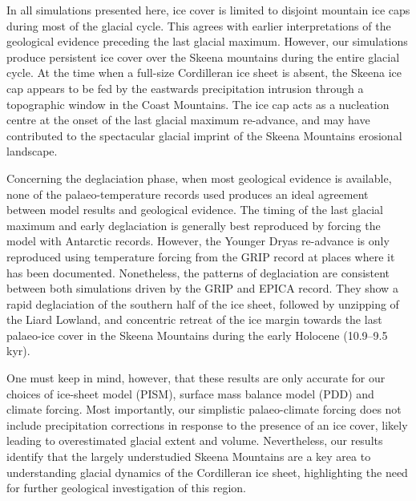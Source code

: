 \documentclass[tc, manuscript]{copernicus}
\begin{document}
In all simulations presented here, ice cover is limited to disjoint mountain ice
caps during most of the glacial cycle. This agrees with earlier interpretations
of the geological evidence preceding the last glacial maximum. However, our
simulations produce persistent ice cover over the Skeena mountains during
the entire glacial cycle. At the time when a full-size Cordilleran ice sheet is
absent, the Skeena ice cap appears to be fed by the eastwards precipitation
intrusion through a topographic window in the Coast Mountains. The ice cap acts
as a nucleation centre at the onset of the last glacial maximum re-advance, and
may have contributed to the spectacular glacial imprint of the Skeena Mountains
erosional landscape.

Concerning the deglaciation phase, when most geological evidence is available,
none of the palaeo-temperature records used produces an ideal agreement between
model results and geological evidence. The timing of the last glacial maximum
and early deglaciation is generally best reproduced by forcing the model with
Antarctic records. However, the Younger Dryas re-advance is only reproduced
using temperature forcing from the GRIP record at places where it has been
documented. Nonetheless, the patterns of deglaciation are consistent between
both simulations driven by the GRIP and EPICA record. They show a rapid
deglaciation of the southern half of the ice
sheet, followed by unzipping of the Liard Lowland, and concentric retreat of
the ice margin towards the last palaeo-ice cover in the Skeena Mountains
during the early Holocene (10.9--9.5\,kyr).

One must keep in mind, however, that these results are only accurate for our
choices of ice-sheet model (PISM), surface mass balance model (PDD) and climate
forcing. Most importantly, our simplistic
palaeo-climate forcing does not include precipitation corrections in response
to the presence of an ice cover, likely leading to overestimated glacial
extent and volume. Nevertheless, our results identify that the largely
understudied Skeena Mountains are a key area to understanding glacial dynamics
of the Cordilleran ice sheet, highlighting the need for further geological
investigation of this region.




\newpage
\end{document}
